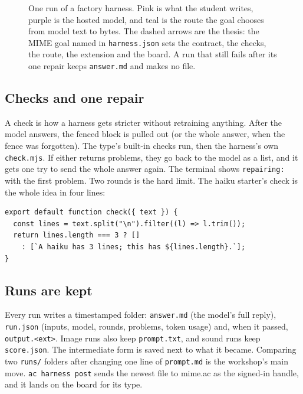 \documentclass[10pt,letterpaper,twocolumn]{article}
\newcommand{\code}[1]{\texttt{#1}}
\begin{document}
\begin{figure}[t]
\caption{One run of a factory harness. Pink is what the student writes,
purple is the hosted model, and teal is the route the goal chooses from
model text to bytes. The dashed arrows are the thesis: the MIME goal named in
\code{harness.json} sets the contract, the checks, the route, the extension
and the board. A run that still fails after its one repair keeps
\code{answer.md} and makes no file.}
\label{fig:flow}
\end{figure}

\subsection{Checks and one repair}
A check is how a harness gets stricter without retraining anything. After the
model answers, the fenced block is pulled out (or the whole answer, when the
fence was forgotten). The type's built-in checks run, then the harness's own
\code{check.mjs}. If either returns problems, they go back to the model as a
list, and it gets one try to send the whole answer again. The terminal shows
\code{repairing:} with the first problem. Two rounds is the hard limit. The
haiku starter's check is the whole idea in four lines:
\begin{Verbatim}
export default function check({ text }) {
  const lines = text.split("\n").filter((l) => l.trim());
  return lines.length === 3 ? []
    : [`A haiku has 3 lines; this has ${lines.length}.`];
}
\end{Verbatim}

\subsection{Runs are kept}
Every run writes a timestamped folder: \code{answer.md} (the model's full
reply), \code{run.json} (inputs, model, rounds, problems, token usage) and,
when it passed, \code{output.<ext>}. Image runs also keep \code{prompt.txt},
and sound runs keep \code{score.json}. The intermediate form is saved next to
what it became. Comparing two \code{runs/} folders after changing one line of
\code{prompt.md} is the workshop's main move. \code{ac harness post} sends the
newest file to mime.ac as the signed-in handle, and it lands on the board
for its type.
\end{document}
